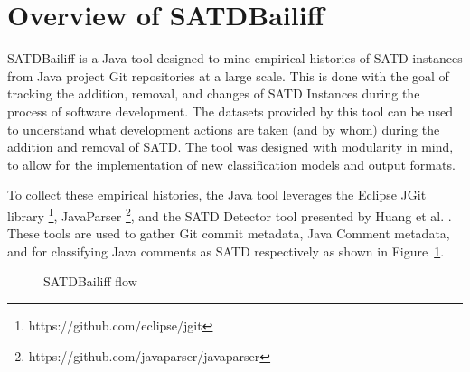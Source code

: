\documentclass[conference]{IEEEtran}
\begin{document}
\section{Overview of SATDBailiff}
\label{sec:overview}

SATDBailiff is a Java tool designed to mine empirical histories of SATD instances from Java project Git repositories at a large scale.
This is done with the goal of tracking the addition, removal, and changes of SATD Instances during the process of software development.
The datasets provided by this tool can be used to understand what development actions are taken (and by whom) during the addition and removal of SATD. The tool was designed with modularity in mind, to allow for the implementation of new classification models and output formats.

To collect these empirical histories, the Java tool leverages the Eclipse JGit library \footnote{https://github.com/eclipse/jgit}, JavaParser \footnote{https://github.com/javaparser/javaparser}, and the SATD Detector tool presented by Huang et al. \cite{Huang}. These tools are used to gather Git commit metadata, Java Comment metadata, and for classifying Java comments as SATD respectively as shown in Figure~\ref{fig:flow}.

\begin{figure}
    \centering
    \caption{SATDBailiff flow}
    \label{fig:flow}
\end{figure}
\end{document}
